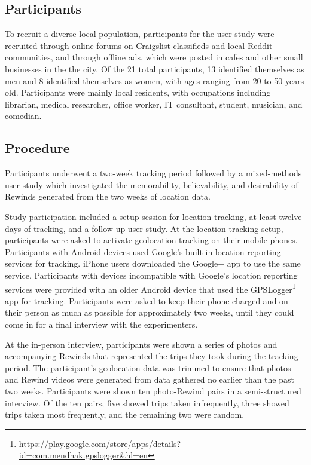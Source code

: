\documentclass{sigchi}
\begin{document}
\subsection{Participants}
To recruit a diverse local population, participants for the user study were recruited through online forums on Craigslist classifieds and local Reddit communities, and through offline ads, which were posted in cafes and other small businesses in the the city. Of the 21 total participants, 13 identified themselves as men and 8 identified themselves as women, with ages ranging from 20 to 50 years old. Participants were mainly local residents, with occupations including librarian, medical researcher, office worker, IT consultant, student, musician, and comedian.

\subsection{Procedure}
Participants underwent a two-week tracking period followed by a mixed-methods user study which investigated the memorability, believability, and desirability of Rewinds generated from the two weeks of location data.

Study participation included a setup session for location tracking, at least twelve days of tracking, and a follow-up user study. At the location tracking setup, participants were asked to activate geolocation tracking on their mobile phones. Participants with Android devices used Google's built-in location reporting services for tracking. iPhone users downloaded the Google+ app to use the same service. Participants with devices incompatible with Google's location reporting services were provided with an older Android device that used the GPSLogger\footnote{\url{https://play.google.com/store/apps/details?id=com.mendhak.gpslogger&hl=en}} app for tracking. Participants were asked to keep their phone charged and on their person as much as possible for approximately two weeks, until they could come in for a final interview with the experimenters.

At the in-person interview, participants were shown a series of photos and accompanying Rewinds that represented the trips they took during the tracking period. The participant's geolocation data was trimmed to ensure that photos and Rewind videos were generated from data gathered no earlier than the past two weeks. Participants were shown ten photo-Rewind pairs in a semi-structured interview.  Of the ten pairs, five showed trips taken infrequently, three showed trips taken most frequently, and the remaining two were random. 
\end{document}

